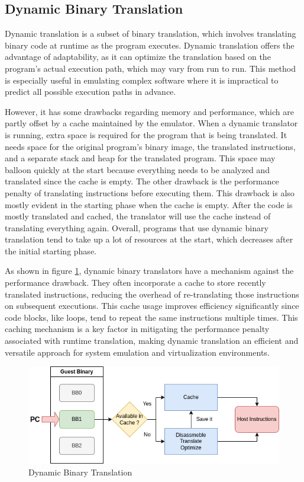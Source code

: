 \subsection{Dynamic Binary Translation}
Dynamic translation is a subset of binary translation, which involves translating binary code at runtime as the program executes.
Dynamic translation offers the advantage of adaptability, as it can optimize the translation based on the program's actual execution path, which may vary from run to run.
This method is especially useful in emulating complex software where it is impractical to predict all possible execution paths in advance.

However, it has some drawbacks regarding memory and performance, which are partly offset by a cache maintained by the emulator.
When a dynamic translator is running, extra space is required for the program that is being translated.
It needs space for the original program's binary image, the translated instructions, and a separate stack and heap for the translated program.
This space may balloon quickly at the start because everything needs to be analyzed and translated since the cache is empty.
The other drawback is the performance penalty of translating instructions before executing them.
This drawback is also mostly evident in the starting phase when the cache is empty.
After the code is mostly translated and cached, the translator will use the cache instead of translating everything again.
Overall, programs that use dynamic binary translation tend to take up a lot of resources at the start, which decreases after the initial starting phase.

As shown in figure \ref{fig:dynamic_binary_translation}, dynamic binary translators have a mechanism against the performance drawback.
They often incorporate a cache to store recently translated instructions, reducing the overhead of re-translating those instructions on subsequent executions.
This cache usage improves efficiency significantly since code blocks, like loops, tend to repeat the same instructions multiple times. 
This caching mechanism is a key factor in mitigating the performance penalty associated with runtime translation, making dynamic translation an efficient and versatile approach for system emulation and virtualization environments.

\begin{figure}[ht]
    \centering
    \includegraphics[width=0.8\linewidth]{figures/dyn_bin_trans}
    \caption{Dynamic Binary Translation}
    \label{fig:dynamic_binary_translation}
\end{figure}

